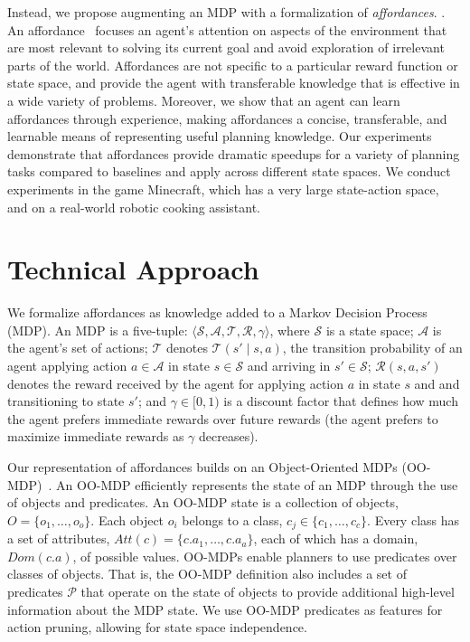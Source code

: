 \documentclass[letterpaper]{article}
\newcommand{\dnote}[1]{\textcolor{Green}{\textbf{}}}
\begin{document}
Instead, we propose augmenting an MDP with a formalization of {\em
affordances}. \dnote{Should add a line here contextualizing affordance literature
(maybe Chemero or Gibson quote)}. An affordance~\cite{gibson77} focuses an agent's
attention on aspects of the environment that are most relevant to
solving its current goal and avoid exploration of irrelevant parts of
the world. Affordances are not specific to a particular reward
function or state space, and provide the agent with transferable
knowledge that is effective in a wide variety of problems. Moreover,
we show that an agent can learn affordances through experience, making
affordances a concise, transferable, and learnable means of
representing useful planning knowledge.  Our experiments demonstrate
that affordances provide dramatic speedups for a variety of planning
tasks compared to baselines and apply across different state spaces.
We conduct experiments in the game Minecraft, which has a very large
state-action space, and on a real-world robotic cooking assistant.


\section{Technical Approach}
\label{sec:affordances}

We formalize affordances as knowledge added to a Markov Decision Process
(MDP).  An MDP is a five-tuple: $\langle \mathcal{S}, \mathcal{A},
\mathcal{T}, \mathcal{R}, \gamma \rangle$, where $\mathcal{S}$ is a
state space; $\mathcal{A}$ is the agent's set of actions;
$\mathcal{T}$ denotes $\mathcal{T}(s' \mid s,a)$, the transition
probability of an agent applying action $a \in \mathcal{A}$ in state
$s \in \mathcal{S}$ and arriving in $s' \in \mathcal{S}$;
$\mathcal{R}(s,a,s')$ denotes the reward received by the agent for
applying action $a$ in state $s$ and and transitioning to state $s'$;
and $\gamma \in [0, 1)$ is a discount factor that defines how much the
agent prefers immediate rewards over future rewards (the agent
prefers to maximize immediate rewards as $\gamma$ decreases).

Our representation of affordances builds on an
Object-Oriented MDPs (OO-MDP)~\citep{diuk08}.  An OO-MDP efficiently
represents the state of an MDP through the use of objects and
predicates.  An OO-MDP state is a collection of objects, $O = \{o_1,
\ldots, o_o \}$.  Each object $o_i$ belongs to a class, $c_j \in
\{c_1, \ldots, c_c\}$. Every class has a set of attributes, $Att(c) =
\{c.a_1, \ldots, c.a_a \}$, each of which has a domain, $Dom(c.a)$, of
possible values. OO-MDPs enable planners to use predicates over
classes of objects. That is, the OO-MDP definition also includes a set
of predicates $\mathcal{P}$ that operate on the state of objects to
provide additional high-level information about the MDP state. We use
OO-MDP predicates as features for action pruning, allowing for state
space independence.
\end{document}

